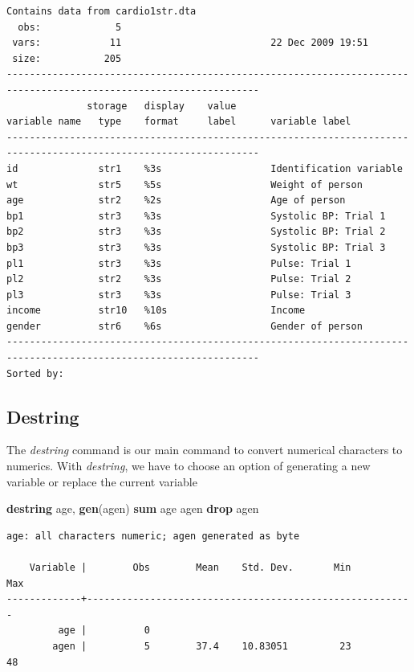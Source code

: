 \documentclass[
]{book}
\newenvironment{Shaded}{\begin{snugshade}}{\end{snugshade}}
\newcommand{\KeywordTok}[1]{\textcolor[rgb]{0.13,0.29,0.53}{\textbf{#1}}}
\newcommand{\NormalTok}[1]{#1}
\begin{document}
\begin{verbatim}
Contains data from cardio1str.dta
  obs:             5                          
 vars:            11                          22 Dec 2009 19:51
 size:           205                          
------------------------------------------------------------------------------------------------------------------
              storage   display    value
variable name   type    format     label      variable label
------------------------------------------------------------------------------------------------------------------
id              str1    %3s                   Identification variable
wt              str5    %5s                   Weight of person
age             str2    %2s                   Age of person
bp1             str3    %3s                   Systolic BP: Trial 1
bp2             str3    %3s                   Systolic BP: Trial 2
bp3             str3    %3s                   Systolic BP: Trial 3
pl1             str3    %3s                   Pulse: Trial 1
pl2             str2    %3s                   Pulse: Trial 2
pl3             str3    %3s                   Pulse: Trial 3
income          str10   %10s                  Income
gender          str6    %6s                   Gender of person
------------------------------------------------------------------------------------------------------------------
Sorted by: 
\end{verbatim}

\subsection{Destring}\label{destring}

The \emph{destring} command is our main command to convert numerical characters to numerics. With \emph{destring}, we have to choose an option of generating a new variable or replace the current variable

\begin{Shaded}
\begin{Highlighting}[]
\KeywordTok{destring}\NormalTok{ age, }\KeywordTok{gen}\NormalTok{(agen)}
\KeywordTok{sum}\NormalTok{ age agen}
\KeywordTok{drop}\NormalTok{ agen}
\end{Highlighting}
\end{Shaded}

\begin{verbatim}
age: all characters numeric; agen generated as byte

    Variable |        Obs        Mean    Std. Dev.       Min        Max
-------------+---------------------------------------------------------
         age |          0
        agen |          5        37.4    10.83051         23         48
\end{verbatim}
\end{document}
